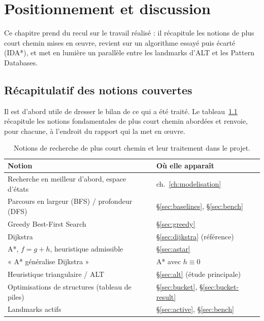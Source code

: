 \chapter{Positionnement et discussion}
\label{ch:discussion}

Ce chapitre prend du recul sur le travail réalisé : il récapitule les notions de
plus court chemin mises en œuvre, revient sur un algorithme essayé puis écarté
(IDA*), et met en lumière un parallèle entre les landmarks d'ALT et les Pattern
Databases.

\section{Récapitulatif des notions couvertes}

Il est d'abord utile de dresser le bilan de ce qui a été traité. Le
tableau~\ref{tab:mapping} récapitule les notions fondamentales de plus
court chemin abordées et renvoie, pour chacune, à l'endroit du rapport qui la
met en œuvre.

\begin{table}[htbp]
  \centering
  \small
  \begin{tabular}{@{}ll@{}}
    \toprule
    Notion & Où elle apparaît \\
    \midrule
    Recherche en meilleur d'abord, espace d'états & ch.~\ref{ch:modelisation} \\
    Parcours en largeur (BFS) / profondeur (DFS)   & \S\ref{sec:baselines}, \S\ref{sec:bench} \\
    Greedy Best-First Search                       & \S\ref{sec:greedy} \\
    Dijkstra                                       & \S\ref{sec:dijkstra} (référence) \\
    A*, $f = g + h$, heuristique admissible        & \S\ref{sec:astar} \\
    « A* généralise Dijkstra »                     & A* avec $h \equiv 0$ \\
    Heuristique triangulaire / ALT                 & \S\ref{sec:alt} (étude principale) \\
    Optimisations de structures (tableau de piles) & \S\ref{sec:bucket}, \S\ref{sec:bucket-result} \\
    Landmarks actifs                               & \S\ref{sec:active}, \S\ref{sec:bench} \\
    \bottomrule
  \end{tabular}
  \caption{Notions de recherche de plus court chemin et leur traitement dans le
  projet.}
  \label{tab:mapping}
\end{table}

